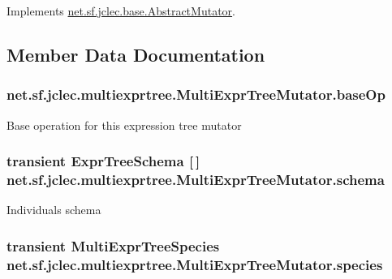 Implements \hyperlink{classnet_1_1sf_1_1jclec_1_1base_1_1_abstract_mutator_ad12e6a2be8fb6082255ce8f399c9b166}{net.\-sf.\-jclec.\-base.\-Abstract\-Mutator}.



\subsection{Member Data Documentation}
\hypertarget{classnet_1_1sf_1_1jclec_1_1multiexprtree_1_1_multi_expr_tree_mutator_a10a9eaed4365b069f3f36e43bbfa0611}{
\subsubsection[{base\-Op}]{ net.\-sf.\-jclec.\-multiexprtree.\-Multi\-Expr\-Tree\-Mutator.\-base\-Op\hspace{0.3cm}{\ttfamily [protected]}}}\label{classnet_1_1sf_1_1jclec_1_1multiexprtree_1_1_multi_expr_tree_mutator_a10a9eaed4365b069f3f36e43bbfa0611}
Base operation for this expression tree mutator \hypertarget{classnet_1_1sf_1_1jclec_1_1multiexprtree_1_1_multi_expr_tree_mutator_a7042b5b6040cf36f65216cfd73c2563c}{
\subsubsection[{schema}]{\setlength{\rightskip}{0pt plus 5cm}transient {\bf Expr\-Tree\-Schema} \mbox{[}$\,$\mbox{]} net.\-sf.\-jclec.\-multiexprtree.\-Multi\-Expr\-Tree\-Mutator.\-schema\hspace{0.3cm}{\ttfamily [protected]}}}\label{classnet_1_1sf_1_1jclec_1_1multiexprtree_1_1_multi_expr_tree_mutator_a7042b5b6040cf36f65216cfd73c2563c}
Individuals schema \hypertarget{classnet_1_1sf_1_1jclec_1_1multiexprtree_1_1_multi_expr_tree_mutator_ae1ad90e7147da166015e346078428a3f}{
\subsubsection[{species}]{\setlength{\rightskip}{0pt plus 5cm}transient {\bf Multi\-Expr\-Tree\-Species} net.\-sf.\-jclec.\-multiexprtree.\-Multi\-Expr\-Tree\-Mutator.\-species\hspace{0.3cm}{\ttfamily [protected]}}}\label{classnet_1_1sf_1_1jclec_1_1multiexprtree_1_1_multi_expr_tree_mutator_ae1ad90e7147da166015e346078428a3f}
